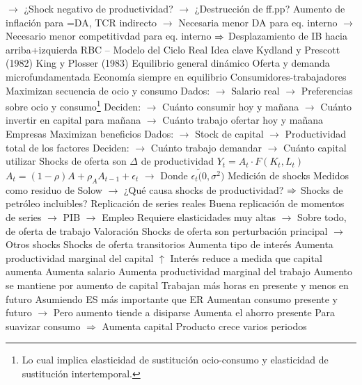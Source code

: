 \documentclass{nuevotema}
\begin{document}
\begin{esquemal}
				\4[] $\to$ ¿Shock negativo de productividad?
				\4[] $\to$ ¿Destrucción de ff.pp?
				\4[] Aumento de inflación para =DA, TCR indirecto
				\4[] $\to$ Necesaria menor DA para eq. interno
				\4[] $\to$ Necesario menor competitivdad para eq. interno
				\4[] $\Rightarrow$ Desplazamiento de IB hacia arriba+izquierda
				\4[] 
		\2 RBC -- Modelo del Ciclo Real
			\3 Idea clave
				\4 Kydland y Prescott (1982)
				\4 King y Plosser (1983)
				\4 Equilibrio general dinámico
				\4[] Oferta y demanda microfundamentada
				\4[] Economía siempre en equilibrio
				\4 Consumidores-trabajadores
				\4[] Maximizan secuencia de ocio y consumo
				\4[] Dados:
				\4[] $\to$ Salario real
				\4[] $\to$ Preferencias sobre ocio y consumo\footnote{Lo cual implica elasticidad de sustitución ocio-consumo y elasticidad de sustitución intertemporal.}
				\4[] Deciden:
				\4[] $\to$ Cuánto consumir hoy y mañana
				\4[] $\to$ Cuánto invertir en capital para mañana
				\4[] $\to$ Cuánto trabajo ofertar hoy y mañana
				\4 Empresas
				\4[] Maximizan beneficios
				\4[] Dados:
				\4[] $\to$ Stock de capital
				\4[] $\to$ Productividad total de los factores
				\4[] Deciden:
				\4[] $\to$ Cuánto trabajo demandar
				\4[] $\to$ Cuánto capital utilizar
				\4 Shocks de oferta son $\Delta$ de productividad
				\4[] $Y_t = A_t \cdot F(K_t, L_t)$
				\4[] $A_t = (1-\rho) A + \rho_A A_{t-1} + \epsilon_t$
				\4[] $\to$ Donde $\epsilon_t \tilde (0, \sigma^2)$
				\4 Medición de shocks
				\4[] Medidos como residuo de Solow
				\4[] $\to$ ¿Qué causa shocks de productividad?
				\4[] $\Rightarrow$ Shocks de petróleo incluibles?
				\4 Replicación de series reales
				\4[] Buena replicación de momentos de series
				\4[] $\to$ PIB
				\4[] $\to$ Empleo
				\4[] Requiere elasticidades muy altas
				\4[] $\to$ Sobre todo, de oferta de trabajo
				\4 Valoración
				\4[] Shocks de oferta son perturbación principal
				\4[] $\to$ Otros shocks
			\3 Shocks de oferta transitorios
				\4 Aumenta tipo de interés
				\4[] Aumenta productividad marginal del capital
				\4[] $\uparrow$ Interés reduce a medida que capital aumenta
				\4 Aumenta salario
				\4[] Aumenta productividad marginal del trabajo
				\4[] Aumento se mantiene por aumento de capital
				\4 Trabajan más horas en presente y menos en futuro
				\4[] Asumiendo ES más importante que ER
				\4 Aumentan consumo presente y futuro
				\4[] $\to$ Pero aumento tiende a disiparse
				\4 Aumenta el ahorro presente
				\4[] Para suavizar consumo
				\4[] $\Rightarrow$ Aumenta capital
				\4 Producto crece varios periodos

\end{esquemal}
\end{document}
